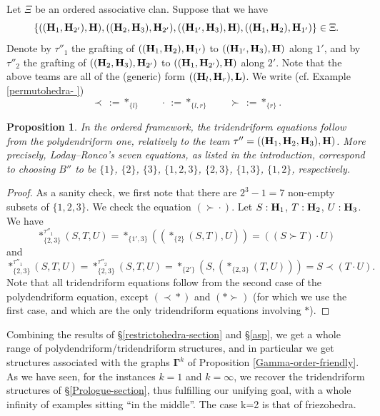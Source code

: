 \documentclass[11pt]{article}
\newtheorem{proposition}[theo]{Proposition}
\theoremstyle{definition}
\numberwithin{equation}{section}
\numberwithin{equation}{section}
\newcommand{\set}[1]{\{#1\}}
\newcommand{\hyper}[1]{{\bf #1}}
\newcommand{\bcdot}{\,{\bm \cdot}\,}
\newcommand{\precstar}{\prec\!\ast}
\newcommand{\astsucc}{\ast\!\succ}
\newcommand{\succbcdot}{\succ\!\!\bcdot\!}
\begin{document}
Let $\Xi$ be an ordered associative clan. Suppose that we have 
$$\{((\hyper{H}_1,\hyper{H}_{2'}),\hyper{H}),   ((\hyper{H}_2,\hyper{H}_{3}),\hyper{H}_{2'}), 
((\hyper{H}_{1'},\hyper{H}_{3}),\hyper{H}),  ((\hyper{H}_1,\hyper{H}_{2}),\hyper{H}_{1'})\}\in\Xi.$$ Denote by $\tau''_1$ the grafting of $((\hyper{H}_1,\hyper{H}_{2}),\hyper{H}_{1'})$ to $((\hyper{H}_{1'},\hyper{H}_{3}),\hyper{H})$ along $1'$, and by $\tau''_2$ the grafting of $((\hyper{H}_2,\hyper{H}_{3}),\hyper{H}_{2'})$ to $((\hyper{H}_1,\hyper{H}_{2'}),\hyper{H})$ along $2'$.  
Note that the above teams are all of the (generic) form
$((\hyper{H}_l,\hyper{H}_r),\hyper{L})$.
We write (cf. Example \ref{permutohedra- })
$$\prec\,:=\ast_{\set{l}} \quad\quad \bcdot\,:=\ast_{\set{l,r}} \quad\quad \succ\,:=\ast_{\set{r}}.$$ 
\begin{proposition} \label{poly-implies-tri}
In the ordered framework, the tridendriform equations follow from the polydendriform one, relatively to the team $\tau''=((\hyper{H}_1, \hyper{H}_2, \hyper{H}_3), \hyper{H})$.
More precisely, Loday--Ronco's seven equations, as listed in the introduction, correspond to  choosing $B''$ to be $\set{1}$, $\set{2}$, $\set{3}$, $\set{1,2,3}$, $\set{2,3}$, $\set{1,3}$, $\set{1,2}$, respectively.
\end{proposition}
\begin{proof} 
As a sanity check, we first note that there are $2^3-1=7$ non-empty subsets of $\set{1,2,3}$. We check the equation $(\succbcdot)$. Let
$S:\hyper{H}_1$, $T:\hyper{H}_2$, $U:\hyper{H}_3$. We have
{\small
$$
\ast^{\tau''_1}_{\set{2,3}} (S,T,U)  =  \ast_{\set{1',3}}((\ast_{\set{2}}(S,T),U))=   ((S \succ T) \bcdot U)$$
and $$ \ast^{\tau''_1}_{\set{2,3}} (S,T,U)  = \ast^{\tau''_2}_{\set{2,3}} (S,T,U) =  \ast_{\set{2'}} (S,(\ast_{\set{2,3}}(T,U))) = S \prec (T \bcdot U).$$}
Note that all tridendriform equations follow from the second case of the polydendriform equation, except  $(\precstar)$  and  $(\astsucc)$ (for which we use the first case, and which are the only tridendriform equations involving $\ast$).
\end{proof}


Combining the results of \S\ref{restrictohedra-section} and \S\ref{asp}, we get a whole range of polydendriform/tridendriform structures, and in particular we get structures associated with the graphs  $\mathbf{\Gamma}^k$ of Proposition \ref{Gamma-order-friendly}. As we have seen,
for the instances $k=1$ and $k=\infty$, we recover the tridendriform structures of \S\ref{Prologue-section}, thus fulfilling our unifying goal, with a whole infinity of examples sitting ``in the middle''. The case k=2 is that of friezohedra.
\end{document}
